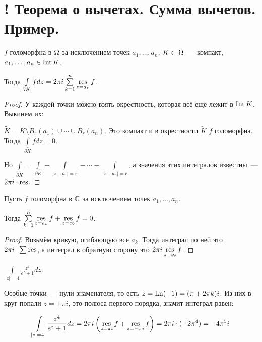 \section{! Теорема о вычетах. Сумма вычетов. Пример.}

\begin{theorem}

    $f$ голоморфна в $\Omega$ за исключением точек
    $a_1, \ldots, a_n$.
    $K \subset \Omega$~--- компакт,
    $a_1, \ldots, a_n \in \operatorname{Int} K$.

    Тогда $\int\limits_{\partial K} fdz =
        2\pi i \sum\limits_{k=1}^n \operatorname*{res}\limits_{z = a_k} f$.
\end{theorem}

\begin{proof}
    У каждой точки можно взять окрестность,
    которая всё ещё лежит в $\operatorname{Int} K$. Выкинем их:

    $\widetilde{K} = K \setminus B_r(a_1) \cup \cdots \cup B_r(a_n)$.
    Это компакт и в окрестности $\widetilde{K}$ $f$ голоморфна.
    Тогда $\int\limits_{\partial \widetilde K} fdz = 0$.

    Но $\int\limits_{\partial \widetilde K} = \int\limits_{\partial K}
        - \int\limits_{|z-a_1|=r} - \cdots - \int\limits_{|z-a_n|=r}$,
    а значения этих интегралов известны~--- $2\pi i \cdot \operatorname*{res}$.
\end{proof}

\begin{consequence}
    Пусть $f$ голоморфна в $\mathbb{C}$ за исключением точек
    $a_1, \ldots, a_n$.

    Тогда
    $\sum\limits_{k=1}^{n} \operatorname*{res}\limits_{z=a_k} f + \operatorname*{res}\limits_{z=\infty} f = 0$.
\end{consequence}

\begin{proof}
    Возьмём кривую, огибающую все $a_k$.
    Тогда интеграл по ней это $2\pi i \cdot \sum \operatorname*{res}$,
    а интеграл в обратную сторону это $2\pi i \operatorname*{res}\limits_{z=\infty} f$.
\end{proof}

\begin{example}
    $\int\limits_{|z|=4} \frac{z^4}{e^z+1}dz$.

    Особые точки~--- нули знаменателя, то есть
    $z = \operatorname{Ln}(-1) = (\pi + 2\pi k)i$.
    Из них в круг попали $z = \pm \pi i$,
    это полюса первого порядка,
    значит интеграл равен:

    \[
        \int\limits_{|z|=4} \frac{z^4}{e^z+1}dz
        = 2\pi i \left(\operatorname*{res}\limits_{z=\pi i} f + \operatorname*{res}\limits_{z=-\pi i} f\right)
        = 2\pi i \cdot (-2\pi^4) = -4\pi^5i
    \]
\end{example}

\newpage

